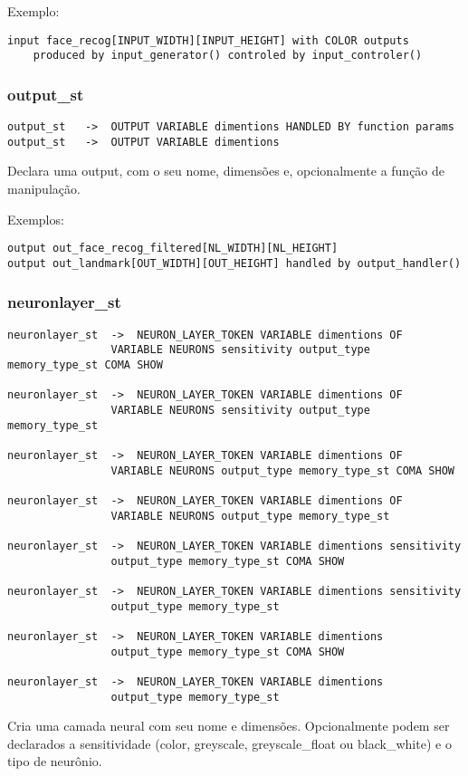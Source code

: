 \documentclass[a4paper,10pt]{article}
\begin{document}
Exemplo:
\begin{lstlisting}
input face_recog[INPUT_WIDTH][INPUT_HEIGHT] with COLOR outputs
	produced by input_generator() controled by input_controler()	
\end{lstlisting}
\vspace{10mm}
	\subsubsection{output\_st}
		\begin{lstlisting}
output_st	->	OUTPUT VARIABLE dimentions HANDLED BY function params
output_st	->	OUTPUT VARIABLE dimentions 
		\end{lstlisting}
Declara uma output, com o seu nome, dimens\~oes e, opcionalmente a fun\c{c}\~ao de manipula\c{c}\~ao.

Exemplos:
\begin{lstlisting}
output out_face_recog_filtered[NL_WIDTH][NL_HEIGHT]
output out_landmark[OUT_WIDTH][OUT_HEIGHT] handled by output_handler()
\end{lstlisting}

\vspace{10mm}
	\subsubsection{neuronlayer\_st}
		\begin{lstlisting}
neuronlayer_st	->	NEURON_LAYER_TOKEN VARIABLE dimentions OF
				VARIABLE NEURONS sensitivity output_type memory_type_st COMA SHOW
				
neuronlayer_st	->	NEURON_LAYER_TOKEN VARIABLE dimentions OF
				VARIABLE NEURONS sensitivity output_type memory_type_st
				
neuronlayer_st	->	NEURON_LAYER_TOKEN VARIABLE dimentions OF
				VARIABLE NEURONS output_type memory_type_st COMA SHOW
				
neuronlayer_st	->	NEURON_LAYER_TOKEN VARIABLE dimentions OF
				VARIABLE NEURONS output_type memory_type_st
				
neuronlayer_st	->	NEURON_LAYER_TOKEN VARIABLE dimentions sensitivity 
				output_type memory_type_st COMA SHOW
				
neuronlayer_st	->	NEURON_LAYER_TOKEN VARIABLE dimentions sensitivity
				output_type memory_type_st
				
neuronlayer_st	->	NEURON_LAYER_TOKEN VARIABLE dimentions
				output_type memory_type_st COMA SHOW
				
neuronlayer_st	->	NEURON_LAYER_TOKEN VARIABLE dimentions
				output_type memory_type_st
		\end{lstlisting}
Cria uma camada neural com seu nome e dimens\~oes. Opcionalmente podem ser declarados a sensitividade (color, greyscale, greyscale\_float ou black\_white) e o tipo de neur\^onio.
\end{document}
